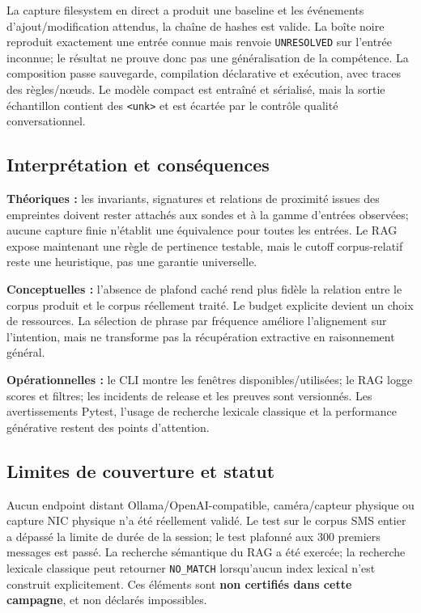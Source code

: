 \documentclass[11pt,a4paper]{article}
\begin{document}
La capture filesystem en direct a produit une baseline et les événements d'ajout/modification attendus, la chaîne de hashes est valide. La boîte noire reproduit exactement une entrée connue mais renvoie \texttt{UNRESOLVED} sur l'entrée inconnue; le résultat ne prouve donc pas une généralisation de la compétence. La composition passe sauvegarde, compilation déclarative et exécution, avec traces des règles/nœuds. Le modèle compact est entraîné et sérialisé, mais la sortie échantillon contient des \texttt{<unk>} et est écartée par le contrôle qualité conversationnel.

\subsection{Interprétation et conséquences}
\textbf{Théoriques :} les invariants, signatures et relations de proximité issues des empreintes doivent rester attachés aux sondes et à la gamme d'entrées observées; aucune capture finie n'établit une équivalence pour toutes les entrées. Le RAG expose maintenant une règle de pertinence testable, mais le cutoff corpus-relatif reste une heuristique, pas une garantie universelle.

\textbf{Conceptuelles :} l'absence de plafond caché rend plus fidèle la relation entre le corpus produit et le corpus réellement traité. Le budget explicite devient un choix de ressources. La sélection de phrase par fréquence améliore l'alignement sur l'intention, mais ne transforme pas la récupération extractive en raisonnement général.

\textbf{Opérationnelles :} le CLI montre les fenêtres disponibles/utilisées; le RAG logge scores et filtres; les incidents de release et les preuves sont versionnés. Les avertissements Pytest, l'usage de recherche lexicale classique et la performance générative restent des points d'attention.

\subsection{Limites de couverture et statut}
Aucun endpoint distant Ollama/OpenAI-compatible, caméra/capteur physique ou capture NIC physique n'a été réellement validé. Le test sur le corpus SMS entier a dépassé la limite de durée de la session; le test plafonné aux 300 premiers messages est passé. La recherche sémantique du RAG a été exercée; la recherche lexicale classique peut retourner \texttt{NO\_MATCH} lorsqu'aucun index lexical n'est construit explicitement. Ces éléments sont \textbf{non certifiés dans cette campagne}, et non déclarés impossibles.
\end{document}
